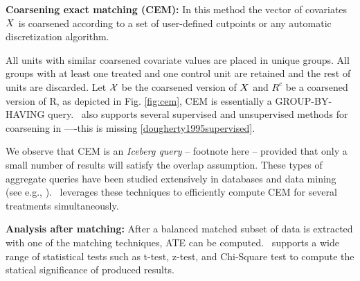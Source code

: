 {\bf Coarsening exact matching (CEM):} In this method the vector of covariates ${{X}}$ is
coarsened according to a set of user-defined cutpoints or any
automatic discretization algorithm.
All units with similar coarsened
covariate values are placed in unique groups. All
groups with at least one treated and one control unit are retained
and the rest of units are discarded.  Let ${{\mathcal{X}}}$ be the
coarsened version of ${{X}}$ and $R^c$ be a coarsened
version of R, as depicted in Fig. \ref{fig:cem},
CEM is essentially a GROUP-BY-HAVING query.
 \GSQL\  also supports several supervised and unsupervised methods for coarsening in ----this is missing \ref{dougherty1995supervised}.

We observe that CEM is an {\em Iceberg query} -- footnote here -- provided that
only a small number of results will satisfy the overlap assumption. These types of aggregate
queries have been studied extensively in databases and data mining (see e.g.,
\cite{fang1999computing,findlater2003iceberg}).
\GSQL\ leverages these techniques to efficiently compute CEM for several treatments simultaneously.



{\bf Analysis after matching:} After a balanced matched subset of data is extracted with one of the
matching techniques, ATE can be computed.
\GSQL\  supports a wide range of statistical tests such as t-test, z-test, and Chi-Square test
to compute the statical significance of produced results.






